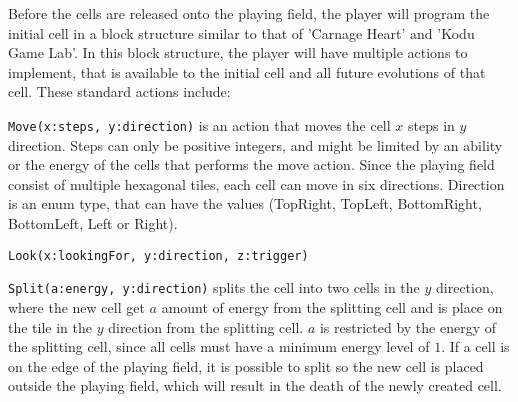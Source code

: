 Before the cells are released onto the playing field, the player will program the initial cell in a block structure similar to that of 'Carnage Heart' and 'Kodu Game Lab'.
In this block structure, the player will have multiple actions to implement, that is available to the initial cell and all future evolutions of that cell.
These standard actions include:\newline

\verb|Move(x:steps, y:direction)| is an action that moves the cell $x$ steps in $y$ direction.
Steps can only be positive integers, and might be limited by an ability or the energy of the cells that performs the move action.
Since the playing field consist of multiple hexagonal tiles, each cell can move in six directions.
Direction is an enum type, that can have the values (TopRight, TopLeft, BottomRight, BottomLeft, Left or Right).\newline

\verb|Look(x:lookingFor, y:direction, z:trigger)|\newline 



\verb|Split(a:energy, y:direction)| splits the cell into two cells in the $y$ direction, where the new cell get $a$ amount of energy from the splitting cell and is place on the tile in the $y$ direction from the splitting cell.
$a$ is restricted by the energy of the splitting cell, since all cells must have a minimum energy level of $1$.
If a cell is on the edge of the playing field, it is possible to split so the new cell is placed outside the playing field, which will result in the death of the newly created cell.
